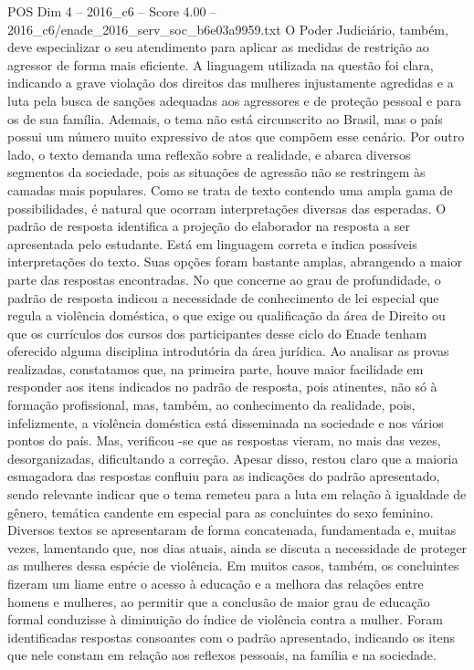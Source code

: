 \begin{textsample}{POS Dim 4 – 2016\_c6 – Score 4.00 – 2016\_c6/enade\_2016\_serv\_soc\_b6e03a9959.txt}
O Poder Judiciário, também, deve especializar o seu atendimento para aplicar as medidas de restrição ao agressor de forma mais eficiente.
A linguagem utilizada na questão foi clara, indicando a grave violação dos direitos das mulheres injustamente agredidas e a luta pela busca de sanções adequadas aos agressores e de proteção pessoal e para os de sua família.
Ademais, o tema não está circunscrito ao Brasil, mas o país possui um número muito expressivo de atos que compõem esse cenário.
Por outro lado, o texto demanda uma reflexão sobre a realidade, e abarca diversos segmentos da sociedade, pois as situações de agressão não se restringem às camadas mais populares.
Como se trata de texto contendo uma ampla gama de possibilidades, é natural que ocorram interpretações diversas das esperadas.
O padrão de resposta identifica a projeção do elaborador na resposta a ser apresentada pelo estudante.
Está em linguagem correta e indica possíveis interpretações do texto.
Suas opções foram bastante amplas, abrangendo a maior parte das respostas encontradas.
No que concerne ao grau de profundidade, o padrão de resposta indicou a necessidade de conhecimento de lei especial que regula a violência doméstica, o que exige ou qualificação da área de Direito ou que os currículos dos cursos dos participantes desse ciclo do Enade tenham oferecido alguma disciplina introdutória da área jurídica.
Ao analisar as provas realizadas, constatamos que, na primeira parte, houve maior facilidade em responder aos itens indicados no padrão de resposta, pois atinentes, não só à formação profissional, mas, também, ao conhecimento da realidade, pois, infelizmente, a violência doméstica está disseminada na sociedade e nos vários pontos do país.
Mas, verificou -se que as respostas vieram, no mais das vezes, desorganizadas, dificultando a correção.
Apesar disso, restou claro que a maioria esmagadora das respostas confluiu para as indicações do padrão apresentado, sendo relevante indicar que o tema remeteu para a luta em relação à igualdade de gênero, temática candente em especial para as concluintes do sexo feminino.
Diversos textos se apresentaram de forma concatenada, fundamentada e, muitas vezes, lamentando que, nos dias atuais, ainda se discuta a necessidade de proteger as mulheres dessa espécie de violência.
Em muitos casos, também, os concluintes fizeram um liame entre o acesso à educação e a melhora das relações entre homens e mulheres, ao permitir que a conclusão de maior grau de educação formal conduzisse à diminuição do índice de violência contra a mulher.
Foram identificadas respostas consoantes com o padrão apresentado, indicando os itens que nele constam em relação aos reflexos pessoais, na família e na sociedade.

\end{textsample}
